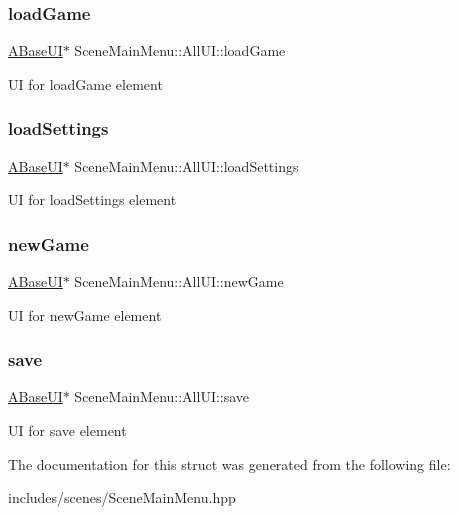 \subsubsection{\texorpdfstring{load\+Game}{loadGame}}
{\footnotesize\ttfamily \hyperlink{class_a_base_u_i}{A\+Base\+UI}$\ast$ Scene\+Main\+Menu\+::\+All\+U\+I\+::load\+Game}

UI for load\+Game element \mbox{\label{struct_scene_main_menu_1_1_all_u_i_ab29e5beed68a4762fb48ccc01989c6bb}} 
\subsubsection{\texorpdfstring{load\+Settings}{loadSettings}}
{\footnotesize\ttfamily \hyperlink{class_a_base_u_i}{A\+Base\+UI}$\ast$ Scene\+Main\+Menu\+::\+All\+U\+I\+::load\+Settings}

UI for load\+Settings element \mbox{\label{struct_scene_main_menu_1_1_all_u_i_a51cbd15371ce654749adf34402e64aed}} 
\subsubsection{\texorpdfstring{new\+Game}{newGame}}
{\footnotesize\ttfamily \hyperlink{class_a_base_u_i}{A\+Base\+UI}$\ast$ Scene\+Main\+Menu\+::\+All\+U\+I\+::new\+Game}

UI for new\+Game element \mbox{\label{struct_scene_main_menu_1_1_all_u_i_a801aade41279dd9c41b1c09b1ab74459}} 
\subsubsection{\texorpdfstring{save}{save}}
{\footnotesize\ttfamily \hyperlink{class_a_base_u_i}{A\+Base\+UI}$\ast$ Scene\+Main\+Menu\+::\+All\+U\+I\+::save}

UI for save element 

The documentation for this struct was generated from the following file\+:\begin{DoxyCompactItemize}
\item 
includes/scenes/Scene\+Main\+Menu.\+hpp\end{DoxyCompactItemize}
